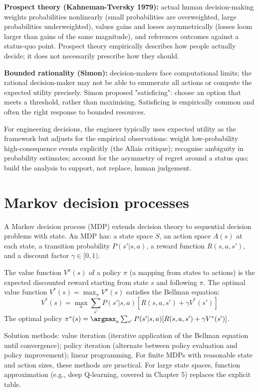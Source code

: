 \textbf{Prospect theory (Kahneman-Tversky 1979):} actual human decision-making weights probabilities nonlinearly (small probabilities are overweighted, large probabilities underweighted), values gains and losses asymmetrically (losses loom larger than gains of the same magnitude), and references outcomes against a status-quo point. Prospect theory empirically describes how people actually decide; it does not necessarily prescribe how they should.

\textbf{Bounded rationality (Simon):} decision-makers face computational limits; the rational decision-maker may not be able to enumerate all actions or compute the expected utility precisely. Simon proposed "satisficing": choose an option that meets a threshold, rather than maximising. Satisficing is empirically common and often the right response to bounded resources.

For engineering decisions, the engineer typically uses expected utility as the framework but adjusts for the empirical observations: weight low-probability high-consequence events explicitly (the Allais critique); recognise ambiguity in probability estimates; account for the asymmetry of regret around a status quo; build the analysis to support, not replace, human judgement.

\section{Markov decision processes}

A Markov decision process (MDP) extends decision theory to sequential decision problems with state. An MDP has: a state space $S$, an action space $A(s)$ at each state, a transition probability $P(s' | s, a)$, a reward function $R(s, a, s')$, and a discount factor $\gamma \in [0, 1)$.

The value function $V^\pi(s)$ of a policy $\pi$ (a mapping from states to actions) is the expected discounted reward starting from state $s$ and following $\pi$. The optimal value function $V^*(s) = \max_\pi V^\pi(s)$ satisfies the Bellman equation:
$$V^*(s) = \max_a \sum_{s'} P(s' | s, a) [R(s, a, s') + \gamma V^*(s')]$$
The optimal policy $\pi^*(s) = \argmax_a \sum_{s'} P(s' | s, a) [R(s, a, s') + \gamma V^*(s')]$.

Solution methods: value iteration (iterative application of the Bellman equation until convergence); policy iteration (alternate between policy evaluation and policy improvement); linear programming. For finite MDPs with reasonable state and action sizes, these methods are practical. For large state spaces, function approximation (e.g., deep Q-learning, covered in Chapter 5) replaces the explicit table.

